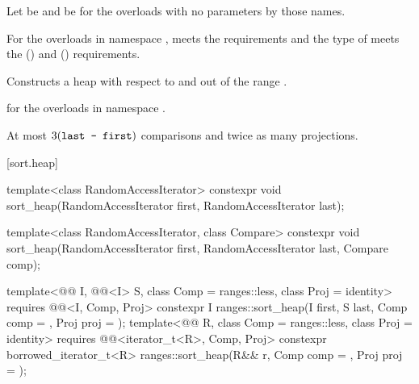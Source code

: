 \begin{itemdescr}
\pnum
Let  be 
and  be 
for the overloads with no parameters by those names.

\pnum
\expects
For the overloads in namespace ,
 meets
the  requirements and
the type of  meets
the  () and
 () requirements.

\pnum
\effects
Constructs a heap with respect to  and 
out of the range .

\pnum
\returns
{} for the overloads in namespace .

\pnum
\complexity
At most $3(\tcode{last - first})$ comparisons and twice as many projections.
\end{itemdescr}

[sort.heap]{}

%
\begin{itemdecl}
template<class RandomAccessIterator>
  constexpr void sort_heap(RandomAccessIterator first, RandomAccessIterator last);

template<class RandomAccessIterator, class Compare>
  constexpr void sort_heap(RandomAccessIterator first, RandomAccessIterator last,
                           Compare comp);

template<@@ I, @@<I> S, class Comp = ranges::less,
         class Proj = identity>
  requires @@<I, Comp, Proj>
  constexpr I
    ranges::sort_heap(I first, S last, Comp comp = {}, Proj proj = {});
template<@@ R, class Comp = ranges::less, class Proj = identity>
  requires @@<iterator_t<R>, Comp, Proj>
  constexpr borrowed_iterator_t<R>
    ranges::sort_heap(R&& r, Comp comp = {}, Proj proj = {});
\end{itemdecl}

